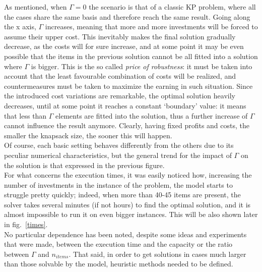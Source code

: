 \documentclass{article}
\begin{document}
As mentioned, when $\Gamma=0$ the scenario is that of a classic KP problem, where all the cases share the same basis and therefore reach the same result. Going along the x axis, $\Gamma$ increases, meaning that more and more investments will be forced to assume their upper cost. This inevitably makes the final solution gradually decrease, as the costs will for sure increase, and at some point it may be even possible that the items in the previous solution cannot be all fitted into a solution where $\Gamma$ is bigger. This is the so called \textit{price of robustness}: it must be taken into account that the least favourable combination of costs will be realized, and countermeasures must be taken to maximize the earning in such situation. Since the introduced cost variations are remarkable, the optimal solution heavily decreases, until at some point it reaches a constant `boundary' value: it means that less than $\Gamma$ elements are fitted into the solution, thus a further increase of $\Gamma$ cannot influence the result anymore. Clearly, having fixed profits and costs, the smaller the knapsack size, the sooner this will happen. \\
Of course, each basic setting behaves differently from the others due to its peculiar numerical characteristics, but the general trend for the impact of $\Gamma$ on the solution is that expressed in the previous figure. \\

For what concerns the execution times, it was easily noticed how, increasing the number of investments in the instance of the problem, the model starts to struggle pretty quickly; indeed, when more than 40-45 items are present, the solver takes several minutes (if not hours) to find the optimal solution, and it is almost impossible to run it on even bigger instances. This will be also shown later in fig.~\ref{times}.\\


No particular dependence has been noted, despite some ideas and experiments that were made, between the execution time and the capacity or the ratio between $\Gamma$ and $n_{items}$.
That said, in order to get solutions in cases much larger than those solvable by the model, heuristic methods needed to be defined.
\end{document}
